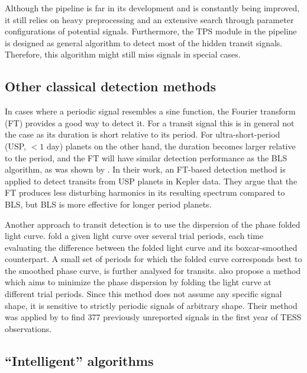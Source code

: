 Although the pipeline is far in its development and is constantly being improved, it still relies on heavy preprocessing and an extensive search through parameter configurations of potential signals. Furthermore, the TPS module in the pipeline is designed as general algorithm to detect most of the hidden transit signals. Therefore, this algorithm might still miss signals in special cases.

\subsection{Other classical detection methods}

In cases where a periodic signal resembles a sine function, the Fourier transform (FT) provides a good way to detect it. For a transit signal this is in general not the case as its duration is short relative to its period. For ultra-short-period (USP, $< 1$ day) planets on the other hand, the duration becomes larger relative to the period, and the FT will have similar detection performance as the BLS algorithm, as was shown by \cite{sanchis2014study}. In their work, an FT-based detection method is applied to detect transits from USP planets in Kepler data. They argue that the FT produces less disturbing harmonics in its resulting spectrum compared to BLS, but BLS is more effective for longer period planets. 

Another approach to transit detection is to use the dispersion of the phase folded light curve. \cite{plavchan2008near} fold a given light curve over several trial periods, each time evaluating the difference between the folded light curve and its boxcar-smoothed counterpart. A small set of periods for which the folded curve corresponds best to the smoothed phase curve, is further analysed for transits. \cite{wheeler2019weird} also propose a method which aims to minimize the phase dispersion by folding the light curve at different trial periods. Since this method does not assume any specific signal shape, it is sensitive to strictly periodic signals of arbitrary shape. Their method was applied by \cite{chakraborty2020hundreds} to find 377 previously unreported signals in the first year of TESS observations.

\subsection{``Intelligent'' algorithms}


